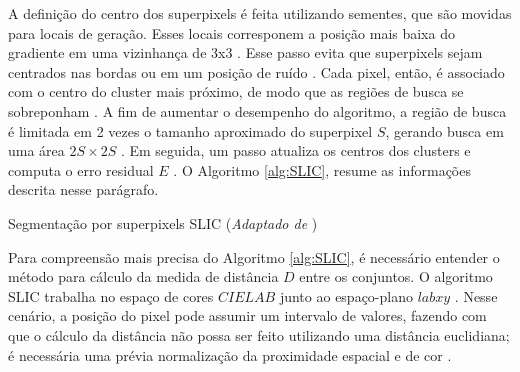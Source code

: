 \begin{document}
A definição do centro dos superpixels é feita utilizando sementes, que são movidas para locais de geração. Esses locais corresponem a posição mais baixa do gradiente em uma vizinhança de 3x3 \cite{SLIC}. Esse passo evita que superpixels sejam centrados nas bordas ou em um posição de ruído \cite{SLIC}. Cada pixel, então, é associado com o centro do cluster mais próximo, de modo que as regiões de busca se sobreponham \cite{SLIC}. A fim de aumentar o desempenho do algoritmo, a região de busca é limitada em 2 vezes o tamanho aproximado do superpixel $S$, gerando busca em uma área $2S \times 2S$ \cite{SLIC}. Em seguida, um passo atualiza os centros dos clusters e computa o erro residual $E$ \cite{SLIC}. O Algoritmo \ref{alg:SLIC}, resume as informações descrita nesse parágrafo.

\begin{algorithm}
    \caption{Segmentação por superpixels SLIC (\textit{Adaptado de } \cite{SLIC})}
    \label{alg:SLIC}
    \begin{algorithmic}[1]
        \Repeat
                \EndIf
                \EndFor
            \EndFor    
    \end{algorithmic}
\end{algorithm}


Para compreensão mais precisa do Algoritmo \ref{alg:SLIC}, é necessário entender o método para cálculo da medida de distância $D$ entre os conjuntos. O algoritmo SLIC trabalha no espaço de cores $CIELAB$ junto ao espaço-plano $labxy$ \cite{SLIC}. Nesse cenário, a posição do pixel pode assumir um intervalo de valores, fazendo com que o cálculo da distância não possa ser feito utilizando uma distância euclidiana; é necessária uma prévia normalização da proximidade espacial e de cor \cite{SLIC}. 
\end{document}

